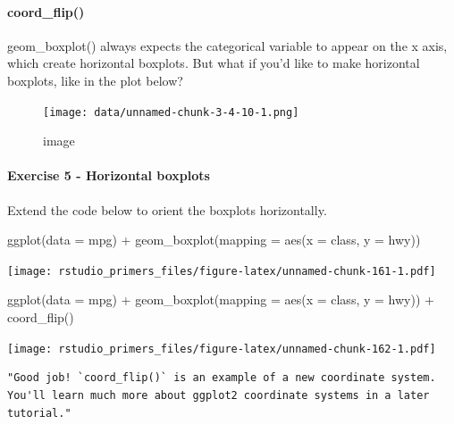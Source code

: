 \documentclass[
]{article}
\newenvironment{Shaded}{\begin{snugshade}}{\end{snugshade}}
\newcommand{\AttributeTok}[1]{\textcolor[rgb]{0.77,0.63,0.00}{#1}}
\newcommand{\FunctionTok}[1]{\textcolor[rgb]{0.00,0.00,0.00}{#1}}
\newcommand{\NormalTok}[1]{#1}
\newcommand{\SpecialCharTok}[1]{\textcolor[rgb]{0.00,0.00,0.00}{#1}}
\begin{document}
\hypertarget{coord_flip}{%
\paragraph{coord\_flip()}\label{coord_flip}}

geom\_boxplot() always expects the categorical variable to appear on the
x axis, which create horizontal boxplots. But what if you'd like to make
horizontal boxplots, like in the plot below?

\begin{figure}
\centering
\texttt{[image: data/unnamed-chunk-3-4-10-1.png]}
\caption{image}
\end{figure}

\hypertarget{exercise-5---horizontal-boxplots}{%
\paragraph{Exercise 5 - Horizontal
boxplots}\label{exercise-5---horizontal-boxplots}}

Extend the code below to orient the boxplots horizontally.

\begin{Shaded}
\begin{Highlighting}[]
\FunctionTok{ggplot}\NormalTok{(}\AttributeTok{data =}\NormalTok{ mpg) }\SpecialCharTok{+}
  \FunctionTok{geom\_boxplot}\NormalTok{(}\AttributeTok{mapping =} \FunctionTok{aes}\NormalTok{(}\AttributeTok{x =}\NormalTok{ class, }\AttributeTok{y =}\NormalTok{ hwy))}
\end{Highlighting}
\end{Shaded}

\texttt{[image: rstudio\_primers\_files/figure-latex/unnamed-chunk-161-1.pdf]}

\begin{Shaded}
\begin{Highlighting}[]
\FunctionTok{ggplot}\NormalTok{(}\AttributeTok{data =}\NormalTok{ mpg) }\SpecialCharTok{+}
  \FunctionTok{geom\_boxplot}\NormalTok{(}\AttributeTok{mapping =} \FunctionTok{aes}\NormalTok{(}\AttributeTok{x =}\NormalTok{ class, }\AttributeTok{y =}\NormalTok{ hwy)) }\SpecialCharTok{+} 
  \FunctionTok{coord\_flip}\NormalTok{()}
\end{Highlighting}
\end{Shaded}

\texttt{[image: rstudio\_primers\_files/figure-latex/unnamed-chunk-162-1.pdf]}

\begin{verbatim}
"Good job! `coord_flip()` is an example of a new coordinate system. You'll learn much more about ggplot2 coordinate systems in a later tutorial."
\end{verbatim}
\end{document}
